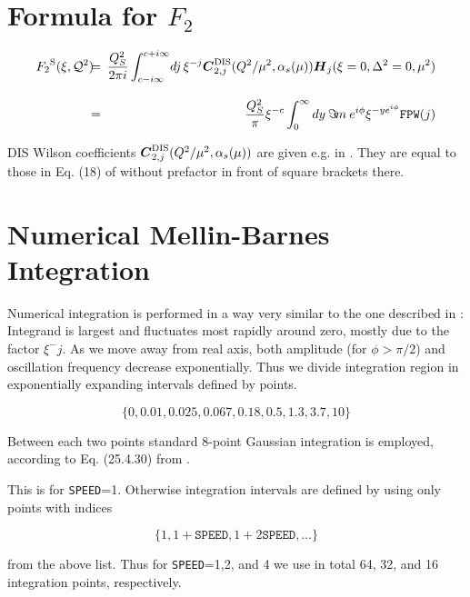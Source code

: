 \documentclass[12pt]{article}
\begin{document}
\section{Formula for $F_2$}  

\begin{eqnarray*}
{{F_2}^{\rm S}}(\xi,{\cal Q}^2)
&\!\!\!=\!\!\!& \frac{Q_{S}^2}{2 \pi i}\int_{c-i \infty}^{c+ i \infty}\!
dj\,\xi^{-j}
\mbox{\boldmath $C$}^{\rm DIS}_{2,j}(Q^2/\mu^2,\alpha_s(\mu))
\mbox{\boldmath $H$}_{j} (\xi=0,\Delta^2=0,\mu^2) \\[2ex]
&\!\!\!=\!\!\!& \frac{Q_{S}^2}{\pi} \xi^{-c}
\int_{0}^{\infty} dy\: \Im\! m\: e^{i\phi} \xi^{- y e^{i\phi}}
\texttt{FPW}(j)
\label{<F2formula>}
\end{eqnarray*}

DIS Wilson coefficients $\mbox{\boldmath $C$}^{\rm DIS}_{2,j}(Q^2/\mu^2,\alpha_s(\mu))$
are given e.g. in \cite{vanNeerven:2000uj}. They are equal to those in
 Eq. (18) of \cite{Kumericki:2006xx} without prefactor in front of square brackets there.

\section{Numerical Mellin-Barnes Integration}  

Numerical integration is performed in a way very similar to the one described in
\cite{Vogt:2004ns}: Integrand is largest and
fluctuates most rapidly around zero, mostly due to the factor $\xi^-j$. As we
move away from real axis, both
amplitude (for $\phi > \pi/2$) and oscillation frequency decrease exponentially.
Thus we divide integration region in exponentially expanding intervals
defined by points.

\begin{equation}
 \{0, 0.01, 0.025, 0.067, 0.18, 0.5, 1.3, 3.7, 10\}
\label{<intervals>}
\end{equation}

Between each two points standard 8-point Gaussian integration is employed, according
to Eq. (25.4.30) from \cite{AbS}.

This is for \texttt{SPEED}=1. Otherwise integration intervals are defined by using
only points with indices

\begin{equation}
 \{ 1, 1 + \texttt{SPEED}, 1 + 2 \texttt{SPEED}, \ldots \}
\label{<speedintervals>}
\end{equation}

from the above list. Thus for \texttt{SPEED}=1,2, and 4 we use in total 64, 32, and 16
integration points, respectively.

%

%

\end{document}
